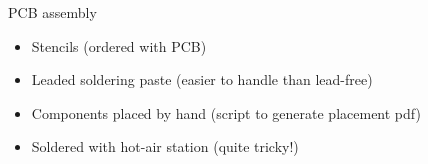 \documentclass[compress,red]{beamer}
\begin{document}
\begin{frame}{PCB assembly}

  \begin{block}{}
    \begin{itemize}
    \item Stencils (ordered with PCB)
    \item Leaded soldering paste (easier to handle than lead-free)
    \item Components placed by hand (script to generate placement pdf)
    \item Soldered with hot-air station (quite tricky!)
    \end{itemize}
  \end{block}

  \begin{center}
  \end{center}

  \note[item]{}

\end{frame}
\end{document}
